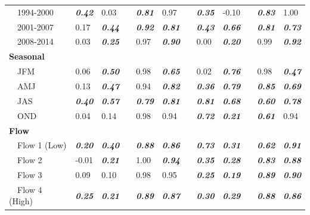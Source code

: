\documentclass[letterpaper,12pt,oneside]{article}\usepackage[]{graphicx}\usepackage[]{color}
\begin{document}
\begin{table}[!tbp]
\begin{center}
\begin{tabular}{lllcllcllcll}
~~1994-2000&{\bf \textit{0.42}}&0.03&&{\bf \textit{0.81}}&0.97&&{\bf \textit{0.35}}&-0.10&&{\bf \textit{0.83}}&1.00\tabularnewline
~~2001-2007&0.17&{\bf \textit{0.44}}&&{\bf \textit{0.92}}&{\bf \textit{0.81}}&&{\bf \textit{0.43}}&{\bf \textit{0.66}}&&{\bf \textit{0.81}}&{\bf \textit{0.73}}\tabularnewline
~~2008-2014&0.03&{\bf \textit{0.25}}&&0.97&{\bf \textit{0.90}}&&0.00&{\bf \textit{0.20}}&&0.99&{\bf \textit{0.92}}\tabularnewline
\hline
{\bfseries Seasonal}&&&&&&&&&&&\tabularnewline
~~JFM&0.06&{\bf \textit{0.50}}&&0.98&{\bf \textit{0.65}}&&0.02&{\bf \textit{0.76}}&&0.98&{\bf \textit{0.47}}\tabularnewline
~~AMJ&0.13&{\bf \textit{0.47}}&&0.94&{\bf \textit{0.82}}&&{\bf \textit{0.36}}&{\bf \textit{0.79}}&&{\bf \textit{0.85}}&{\bf \textit{0.69}}\tabularnewline
~~JAS&{\bf \textit{0.40}}&{\bf \textit{0.57}}&&{\bf \textit{0.79}}&{\bf \textit{0.81}}&&{\bf \textit{0.81}}&{\bf \textit{0.68}}&&{\bf \textit{0.60}}&{\bf \textit{0.78}}\tabularnewline
~~OND&0.04&0.14&&0.98&0.94&&{\bf \textit{0.72}}&{\bf \textit{0.21}}&&{\bf \textit{0.61}}&0.94\tabularnewline
\hline
{\bfseries Flow}&&&&&&&&&&&\tabularnewline
~~Flow 1 (Low)&{\bf \textit{0.20}}&{\bf \textit{0.40}}&&{\bf \textit{0.88}}&{\bf \textit{0.86}}&&{\bf \textit{0.73}}&{\bf \textit{0.31}}&&{\bf \textit{0.62}}&{\bf \textit{0.91}}\tabularnewline
~~Flow 2&-0.01&{\bf \textit{0.21}}&&1.00&{\bf \textit{0.94}}&&{\bf \textit{0.35}}&{\bf \textit{0.28}}&&{\bf \textit{0.83}}&{\bf \textit{0.88}}\tabularnewline
~~Flow 3&0.09&0.10&&0.98&0.95&&{\bf \textit{0.25}}&{\bf \textit{0.19}}&&{\bf \textit{0.89}}&{\bf \textit{0.90}}\tabularnewline
~~Flow 4 (High)&{\bf \textit{0.25}}&{\bf \textit{0.21}}&&{\bf \textit{0.89}}&{\bf \textit{0.87}}&&{\bf \textit{0.30}}&{\bf \textit{0.29}}&&{\bf \textit{0.88}}&{\bf \textit{0.86}}\tabularnewline
\hline
\end{tabular}\end{center}

\end{table}
\end{document}
